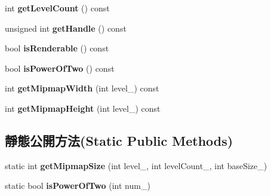 \begin{DoxyCompactItemize}
\item 
int {\bfseries get\+Level\+Count} () const \hypertarget{class_i_dream_sky_1_1_g_x_pixel_buffer_ae192558fa477758a511381bb338a724b}{}\label{class_i_dream_sky_1_1_g_x_pixel_buffer_ae192558fa477758a511381bb338a724b}

\item 
unsigned int {\bfseries get\+Handle} () const \hypertarget{class_i_dream_sky_1_1_g_x_pixel_buffer_af22085ae79f9d3cfdff5c4d6e0852d45}{}\label{class_i_dream_sky_1_1_g_x_pixel_buffer_af22085ae79f9d3cfdff5c4d6e0852d45}

\item 
bool {\bfseries is\+Renderable} () const \hypertarget{class_i_dream_sky_1_1_g_x_pixel_buffer_aa85b6f66faa63184cc9af1f2dc9b749e}{}\label{class_i_dream_sky_1_1_g_x_pixel_buffer_aa85b6f66faa63184cc9af1f2dc9b749e}

\item 
bool {\bfseries is\+Power\+Of\+Two} () const \hypertarget{class_i_dream_sky_1_1_g_x_pixel_buffer_a513632836291cb6f09be4e7796cf4379}{}\label{class_i_dream_sky_1_1_g_x_pixel_buffer_a513632836291cb6f09be4e7796cf4379}

\item 
int {\bfseries get\+Mipmap\+Width} (int level\+\_\+) const \hypertarget{class_i_dream_sky_1_1_g_x_pixel_buffer_aeadca3a1498815c2c8d26e94d0332148}{}\label{class_i_dream_sky_1_1_g_x_pixel_buffer_aeadca3a1498815c2c8d26e94d0332148}

\item 
int {\bfseries get\+Mipmap\+Height} (int level\+\_\+) const \hypertarget{class_i_dream_sky_1_1_g_x_pixel_buffer_ae43c6cebb2fc3550de05569ceb386a91}{}\label{class_i_dream_sky_1_1_g_x_pixel_buffer_ae43c6cebb2fc3550de05569ceb386a91}

\end{DoxyCompactItemize}
\subsection*{靜態公開方法(Static Public Methods)}
\begin{DoxyCompactItemize}
\item 
static int {\bfseries get\+Mipmap\+Size} (int level\+\_\+, int level\+Count\+\_\+, int base\+Size\+\_\+)\hypertarget{class_i_dream_sky_1_1_g_x_pixel_buffer_a17f4c1d28e605361c15408d761a12793}{}\label{class_i_dream_sky_1_1_g_x_pixel_buffer_a17f4c1d28e605361c15408d761a12793}

\item 
static bool {\bfseries is\+Power\+Of\+Two} (int num\+\_\+)\hypertarget{class_i_dream_sky_1_1_g_x_pixel_buffer_aeab8fc2017d4417251ac874f2e43a1c9}{}\label{class_i_dream_sky_1_1_g_x_pixel_buffer_aeab8fc2017d4417251ac874f2e43a1c9}

\end{DoxyCompactItemize}
